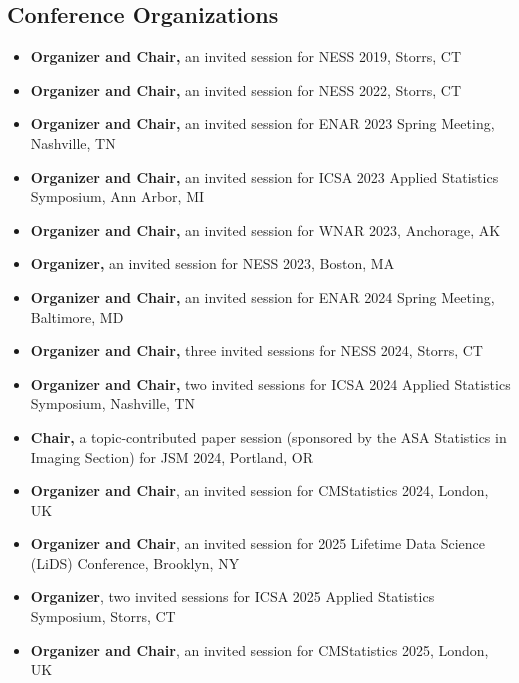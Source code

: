 \documentclass[12pt]{article}
\begin{document}
	\subsection*{Conference Organizations}
	\begin{itemize}
		\item {\bf Organizer and Chair,} an invited session for NESS 
		2019, Storrs, CT
		\item {\bf Organizer and Chair,} an invited session for NESS 
		2022, Storrs, CT
		\item {\bf Organizer and Chair,} an invited session for ENAR 
		2023 Spring Meeting, Nashville, TN
		\item {\bf Organizer and Chair,} an invited session for ICSA 
		2023 Applied Statistics Symposium, Ann Arbor, MI
		\item {\bf Organizer and Chair,} an invited session for WNAR 
		2023, Anchorage, AK
		\item {\bf Organizer,} an invited session for NESS 2023, 
		Boston, MA
		\item {\bf Organizer and Chair,} an invited session for ENAR 
		2024 Spring Meeting, Baltimore, MD
		\item {\bf Organizer and Chair,} three invited sessions for 
		NESS 2024, Storrs, CT
		\item {\bf Organizer and Chair,} two invited sessions for 
		ICSA 2024 Applied Statistics Symposium, Nashville, TN
		\item {\bf Chair,} a topic-contributed paper session 
		(sponsored by the ASA Statistics in Imaging Section) for JSM 
		2024, Portland, OR
		\item {\bf Organizer and Chair}, an invited session for 
		CMStatistics 2024, London, UK 
		\item {\bf Organizer and Chair}, an invited session for 2025 
		Lifetime Data Science (LiDS) Conference, Brooklyn, NY 
		\item {\bf Organizer}, two invited sessions for ICSA 2025 
		Applied Statistics Symposium, Storrs, CT
		\item {\bf Organizer and Chair}, an invited session for 
		CMStatistics 2025, London, UK 
	\end{itemize}
	
	
\end{document}
